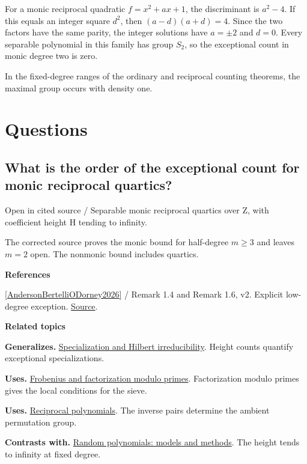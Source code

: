 \documentclass[11pt,a4paper,oneside,openany]{book}
\newenvironment{sources}{\par\smallskip\begingroup\footnotesize\color{atlasgray}\leftskip=10pt\setlength{\parskip}{2pt}}{\par\endgroup\smallskip}
\begin{document}
\begin{atlasblock}[standard]
\color{black} For a monic reciprocal quadratic \(f=x^2+ax+1\), the discriminant is \(a^2-4\). If this equals an integer square \(d^2\), then \((a-d)(a+d)=4\). Since the two factors have the same parity, the integer solutions have \(a=\pm2\) and \(d=0\). Every separable polynomial in this family has group \(S_2\), so the exceptional count in monic degree two is zero.\par
\end{atlasblock}\color{black}
\color{black} In the fixed-degree ranges of the ordinary and reciprocal counting theorems, the maximal group occurs with density one.\par
{}\section*{Questions}
\subsection*{What is the order of the exceptional count for monic reciprocal quartics?}
{\small\sffamily\color{atlasgold}Open in cited source / Separable monic reciprocal quartics over Z, with coefficient height H tending to infinity.}\par\smallskip
\color{black} The corrected source proves the monic bound for half-degree \(m\ge3\) and leaves \(m=2\) open. The nonmonic bound includes quartics.\par
\begin{sources}
\textbf{References}\par\smallskip
\noindent\hyperlink{ref:AndersonBertelliODorney2026}{[AndersonBertelliODorney2026]} / Remark 1.4 and Remark 1.6, v2. Explicit low-degree exception. \href{https://arxiv.org/abs/2406.18970v2}{Source}.\par
\end{sources}\color{black}
\par\medskip\begingroup\footnotesize\setlength{\parskip}{1pt}\textbf{\sffamily\color{atlasgreen}Related topics}\par
\color{black}\textbf{Generalizes.} \hyperlink{article:specialization}{Specialization and Hilbert irreducibility}. Height counts quantify exceptional specializations.\par
\color{black}\textbf{Uses.} \hyperlink{article:frobenius}{Frobenius and factorization modulo primes}. Factorization modulo primes gives the local conditions for the sieve.\par
\color{black}\textbf{Uses.} \hyperlink{article:reciprocity}{Reciprocal polynomials}. The inverse pairs determine the ambient permutation group.\par
\color{black}\textbf{Contrasts with.} \hyperlink{article:random-models}{Random polynomials: models and methods}. The height tends to infinity at fixed degree.\par
\endgroup
\end{document}
